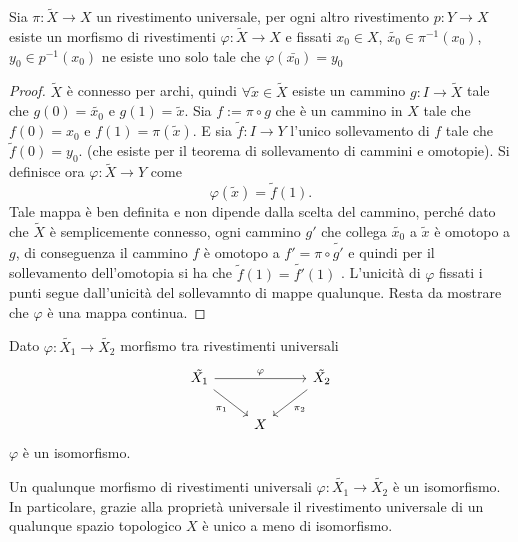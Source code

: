\documentclass[]{article}
\begin{document}
\begin{proposition} 
    Sia $\pi: \tilde{X} \to X$ un rivestimento universale, per ogni altro rivestimento $p: Y \to X$ esiste un morfismo
    di rivestimenti $\varphi: \tilde{X} \to X$ e fissati $x_0 \in X$, $\tilde{x_0}\in \pi^{-1}(x_0)$, $y_0 \in p^{-1}(x_0)$
    ne esiste uno solo tale che $\varphi(\bar{x_0}) = y_0$
\end{proposition}

\begin{proof} \nl
    $\tilde{X}$ \`e connesso per archi, quindi $\forall \tilde{x} \in \tilde{X}$ esiste un cammino $g: I \to \tilde{X}$
    tale che $g(0) = \tilde{x_0}$ e $g(1) = \tilde{x}$. \nl
    Sia $f := \pi \circ g$ che \`e un cammino in $X$ tale che $f(0) = x_0$ e $f(1) = \pi(\tilde{x})$. \nl
    E sia $\tilde{f} : I \to Y$ l'unico sollevamento di $f$ tale che $\tilde{f}(0) = y_0$. (che esiste per il teorema di sollevamento di cammini e omotopie).
    Si definisce ora $\varphi: \tilde{X} \to Y$ come
    \[
        \varphi(\tilde{x}) = \tilde{f}(1).
    \]
    Tale mappa \`e ben definita e non dipende dalla scelta del cammino, perch\'e dato che $\tilde{X}$ \`e semplicemente connesso, ogni cammino $g'$ che collega $\tilde{x_0}$ a $\tilde{x}$ \`e omotopo a $g$,
    di conseguenza il cammino $f$ \`e omotopo a $f' = \pi \circ \tilde{g'}$ e quindi per il sollevamento dell'omotopia si ha che $\tilde{f}(1) = \tilde{f'}(1)$ . \nl
    L'unicit\`a di $\varphi$ fissati i punti segue dall'unicit\`a del sollevamnto di mappe qualunque. \nl
    Resta da mostrare che $\varphi$ \`e una mappa continua. 
\end{proof}

\begin{corollary} \nl
    Dato $\varphi: \tilde{X_1} \to \tilde{X_2}$ morfismo tra rivestimenti universali
    \[\begin{tikzcd}
	{\tilde{X_1}} && {\tilde{X_2}} \\
	& X
	\arrow["\varphi", from=1-1, to=1-3]
	\arrow["{\pi_1}"', from=1-1, to=2-2]
	\arrow["{\pi_2}", from=1-3, to=2-2]
    \end{tikzcd}\]
    $\varphi$ \`e un isomorfismo.
\end{corollary}

\begin{corollary}  \nl
    Un qualunque morfismo di rivestimenti universali $\varphi: \tilde{X_1} \to \tilde{X_2}$ \`e un isomorfismo. \nl
    In particolare, grazie alla propriet\`a universale il rivestimento universale di un qualunque spazio topologico $X$ \`e unico a meno di isomorfismo. \nl
\end{corollary}
\end{document}
